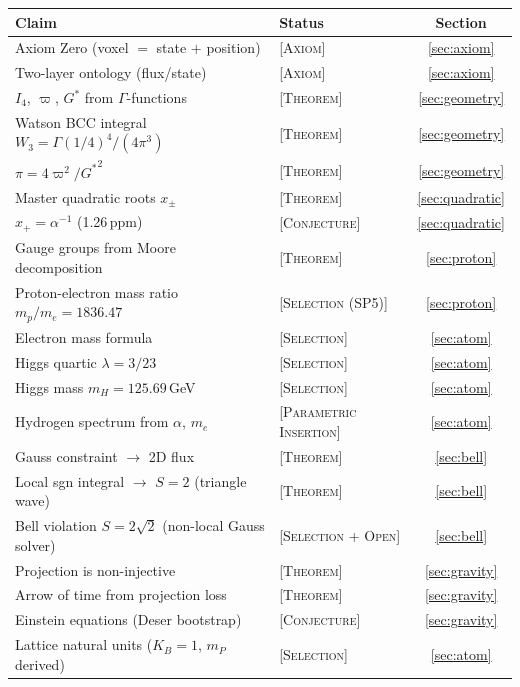 \documentclass[12pt]{article}
\newcommand{\etag}[1]{{\normalfont\textsc{\footnotesize [#1]}}}
\theoremstyle{compact}
\begin{document}
\begin{center}
\small
\begin{tabular}{llc}
\toprule
\textbf{Claim} & \textbf{Status} & \textbf{Section} \\
\midrule
Axiom Zero (voxel $=$ state $+$ position) & \etag{Axiom} & \ref{sec:axiom} \\
Two-layer ontology (flux/state) & \etag{Axiom} & \ref{sec:axiom} \\
$I_4$, $\varpi$, ${G^{*}}$ from $\Gamma$-functions & \etag{Theorem} & \ref{sec:geometry} \\
Watson BCC integral $W_3 = \Gamma(1/4)^4/(4\pi^3)$ & \etag{Theorem} & \ref{sec:geometry} \\
$\pi = 4\varpi^2/{G^{*}}^2$ & \etag{Theorem} & \ref{sec:geometry} \\
Master quadratic roots $x_\pm$ & \etag{Theorem} & \ref{sec:quadratic} \\
$x_+ = \alpha^{-1}$ (1.26\,ppm) & \etag{Conjecture} & \ref{sec:quadratic} \\
Gauge groups from Moore decomposition & \etag{Theorem} & \ref{sec:proton} \\
Proton-electron mass ratio $m_p/m_e = 1836.47$ & \etag{Selection (SP5)} & \ref{sec:proton} \\
Electron mass formula & \etag{Selection} & \ref{sec:atom} \\
Higgs quartic $\lambda = 3/23$ & \etag{Selection} & \ref{sec:atom} \\
Higgs mass $m_H = 125.69$\,GeV & \etag{Selection} & \ref{sec:atom} \\
Hydrogen spectrum from $\alpha$, $m_e$ & \etag{Parametric Insertion} & \ref{sec:atom} \\
Gauss constraint $\to$ 2D flux & \etag{Theorem} & \ref{sec:bell} \\
Local sgn integral $\to$ $S = 2$ (triangle wave) & \etag{Theorem} & \ref{sec:bell} \\
Bell violation $S = 2\sqrt{2}$ (non-local Gauss solver) & \etag{Selection + Open} & \ref{sec:bell} \\
Projection is non-injective & \etag{Theorem} & \ref{sec:gravity} \\
Arrow of time from projection loss & \etag{Theorem} & \ref{sec:gravity} \\
Einstein equations (Deser bootstrap) & \etag{Conjecture} & \ref{sec:gravity} \\
Lattice natural units ($K_B = 1$, $m_P$ derived) & \etag{Selection} & \ref{sec:atom} \\
\bottomrule
\end{tabular}
\end{center}
\end{document}
